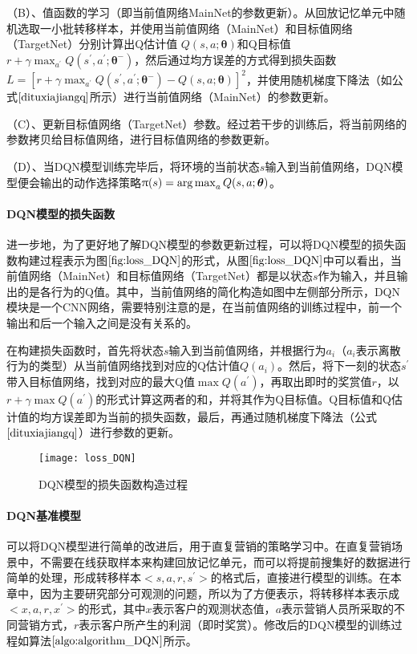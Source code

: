 （B）、值函数的学习（即当前值网络MainNet的参数更新）。从回放记忆单元中随机选取一小批转移样本，并使用当前值网络（MainNet）和目标值网络（TargetNet）分别计算出Q估计值 $Q(s,a;\bm{\theta})$和Q目标值$r+\gamma \max_{a^{'}}Q(s^{'},a^{'};\bm{\theta}^{-})$，然后通过均方误差的方式得到损失函数$L=[r+\gamma \max_{a^{'}}Q(s^{'},a^{'};\bm{\theta}^{-})-Q(s,a;\bm{\theta})]^{2}$，并使用随机梯度下降法（如公式$\eqref{dituxiajiangq}$所示）进行当前值网络（MainNet）的参数更新。

（C）、更新目标值网络（TargetNet）参数。经过若干步的训练后，将当前网络的参数拷贝给目标值网络，进行目标值网络的参数更新。 

（D）、当DQN模型训练完毕后，将环境的当前状态$s$输入到当前值网络，DQN模型便会输出的动作选择策略$\uppi(s)=\operatorname*{arg\,max}_{a}Q(s,a;\bm{\theta})$。

\paragraph{DQN模型的损失函数}
进一步地，为了更好地了解DQN模型的参数更新过程，可以将DQN模型的损失函数构建过程表示为图$\ref{fig:loss_DQN}$的形式，从图$\ref{fig:loss_DQN}$中可以看出，当前值网络（MainNet）和目标值网络（TargetNet）都是以状态$s$作为输入，并且输出的是各行为的Q值。其中，当前值网络的简化构造如图中左侧部分所示，DQN模块是一个CNN网络，需要特别注意的是，在当前值网络的训练过程中，前一个输出和后一个输入之间是没有关系的。

在构建损失函数时，首先将状态$s$输入到当前值网络，并根据行为$a_{i}$（$a_{i}$表示离散行为的类型）从当前值网络找到对应的Q估计值$Q(a_{i})$。然后，将下一刻的状态$s^{'}$带入目标值网络，找到对应的最大Q值$\max Q(a^{'})$，再取出即时的奖赏值$r$，以$r+\gamma \max Q(a^{'})$的形式计算这两者的和，并将其作为Q目标值。Q目标值和Q估计值的均方误差即为当前的损失函数，最后，再通过随机梯度下降法（公式$\eqref{dituxiajiangq}$）进行参数的更新。

\begin{figure}[htbp]
\centering
\texttt{[image: loss\_DQN]}
\caption{DQN模型的损失函数构造过程}
\label{fig:loss_DQN}
\end{figure}

\paragraph{DQN基准模型}
可以将DQN模型进行简单的改进后，用于直复营销的策略学习中。在直复营销场景中，不需要在线获取样本来构建回放记忆单元，而可以将提前搜集好的数据进行简单的处理，形成转移样本$<s, a, r, s^{'}>$的格式后，直接进行模型的训练。在本章中，因为主要研究部分可观测的问题，所以为了方便表示，将转移样本表示成$<x, a, r, x
^{'}>$的形式，其中$x$表示客户的观测状态值，$a$表示营销人员所采取的不同营销方式，$r$表示客户所产生的利润（即时奖赏）。修改后的DQN模型的训练过程如算法$\ref{algo:algorithm_DQN}$所示。

